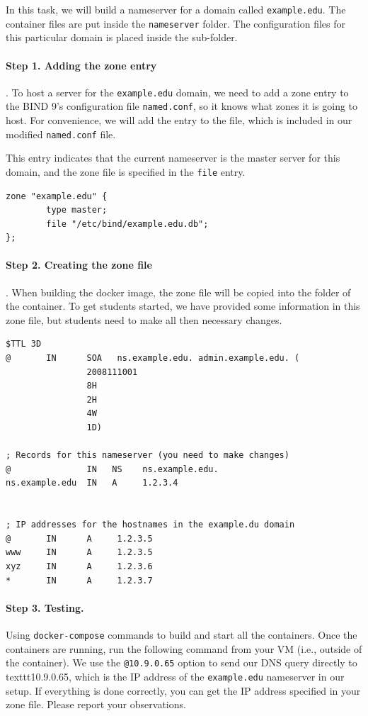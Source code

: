 In this task, we will build a nameserver for a domain 
called \texttt{example.edu}. The container files are 
put inside the \texttt{nameserver} folder. 
The configuration files for this particular domain
is placed inside the  sub-folder.  


\paragraph{Step 1. Adding the zone entry}. To host
a server for the \texttt{example.edu} domain, we need to
add a zone entry to the BIND 9's configuration file \texttt{named.conf}, 
so it knows what zones it is going to host. For convenience,
we will add the entry to the  file, which
is included in our modified \texttt{named.conf} file.


This entry indicates that the current nameserver 
is the master server for this domain, and the zone file is 
specified in the \texttt{file} entry.  


\begin{lstlisting}
zone "example.edu" {
        type master;
        file "/etc/bind/example.edu.db";
};
\end{lstlisting}


\paragraph{Step 2. Creating the zone file}. 
When building the docker image, the zone file 
 will be copied into
the  folder of the container. 
To get students started, we have provided some 
information in this zone file, but students need to make 
all then necessary changes.

\begin{lstlisting}
$TTL 3D
@       IN      SOA   ns.example.edu. admin.example.edu. (
                2008111001
                8H
                2H
                4W
                1D)

; Records for this nameserver (you need to make changes)
@               IN   NS    ns.example.edu.
ns.example.edu  IN   A     1.2.3.4


; IP addresses for the hostnames in the example.du domain
@       IN      A     1.2.3.5
www     IN      A     1.2.3.5
xyz     IN      A     1.2.3.6
*       IN      A     1.2.3.7
\end{lstlisting}
 


\paragraph{Step 3. Testing.} Using \texttt{docker-compose} commands
to build and start all the containers. 
Once the containers are running,
run the following command from your VM (i.e., outside of the 
container). We use the \texttt{@10.9.0.65} option to send our DNS query
directly to texttt{10.9.0.65}, which is the IP
address of the \texttt{example.edu} nameserver in our setup. 
If everything is done correctly, you can get the IP address specified
in your zone file. Please report your observations.

